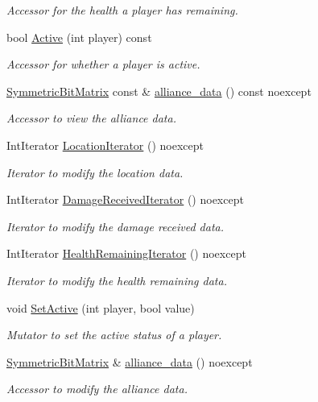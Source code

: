 \begin{DoxyCompactItemize}
\begin{DoxyCompactList}\small\item\em Accessor for the health a player has remaining. \end{DoxyCompactList}\item 
bool \hyperlink{classroundinfo_1_1_round_info_a03a7ee40677506160aef2766929e6105}{Active} (int player) const
\begin{DoxyCompactList}\small\item\em Accessor for whether a player is active. \end{DoxyCompactList}\item 
\hyperlink{class_symmetric_bit_matrix}{Symmetric\+Bit\+Matrix} const  \& \hyperlink{classroundinfo_1_1_round_info_ac19e64df26914ffb0292d1c475ce8a23}{alliance\+\_\+data} () const noexcept
\begin{DoxyCompactList}\small\item\em Accessor to view the alliance data. \end{DoxyCompactList}\item 
Int\+Iterator \hyperlink{classroundinfo_1_1_round_info_ab9e17ca5d68f9981862cbf540cc0b297}{Location\+Iterator} () noexcept
\begin{DoxyCompactList}\small\item\em Iterator to modify the location data. \end{DoxyCompactList}\item 
Int\+Iterator \hyperlink{classroundinfo_1_1_round_info_a94ea1a09ae7680e74188296aef0b0d63}{Damage\+Received\+Iterator} () noexcept
\begin{DoxyCompactList}\small\item\em Iterator to modify the damage received data. \end{DoxyCompactList}\item 
Int\+Iterator \hyperlink{classroundinfo_1_1_round_info_a3a81f2d87bea27339f035201f1887423}{Health\+Remaining\+Iterator} () noexcept
\begin{DoxyCompactList}\small\item\em Iterator to modify the health remaining data. \end{DoxyCompactList}\item 
void \hyperlink{classroundinfo_1_1_round_info_a28d85479753dae18a6b2a27d048d2973}{Set\+Active} (int player, bool value)
\begin{DoxyCompactList}\small\item\em Mutator to set the active status of a player. \end{DoxyCompactList}\item 
\hyperlink{class_symmetric_bit_matrix}{Symmetric\+Bit\+Matrix} \& \hyperlink{classroundinfo_1_1_round_info_a9d5ae58298d3acd11377da7992235762}{alliance\+\_\+data} () noexcept
\begin{DoxyCompactList}\small\item\em Accessor to modify the alliance data. \end{DoxyCompactList}\end{DoxyCompactItemize}
